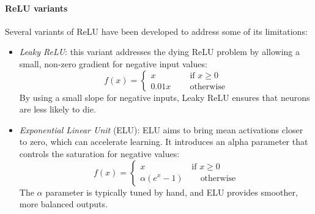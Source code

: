 \paragraph*{ReLU variants}
Several variants of ReLU have been developed to address some of its limitations:
\begin{itemize}
    \item \textit{Leaky ReLU}: this variant addresses the dying ReLU problem by allowing a small, non-zero gradient for negative input values:
        \[f(x)=\begin{cases}
            x \qquad\qquad \text{if } x \geq 0 \\
            0.01x \qquad\: \text{otherwise}
        \end{cases}\]
        By using a small slope for negative inputs, Leaky ReLU ensures that neurons are less likely to die.
    \item \textit{Exponential Linear Unit} (ELU): ELU aims to bring mean activations closer to zero, which can accelerate learning. 
        It introduces an alpha parameter that controls the saturation for negative values:
        \[f(x)=\begin{cases}
            x \qquad\qquad\quad\:\: \text{if } x \geq 0 \\
            \alpha(e^x-1) \qquad \text{otherwise}
        \end{cases}\]
        The $\alpha$ parameter is typically tuned by hand, and ELU provides smoother, more balanced outputs.
\end{itemize}
